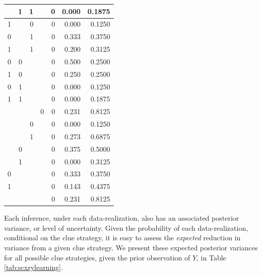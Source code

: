 \documentclass[
  12pt,
]{book}
\begin{document}
\begin{table}
\begin{tabular}[t]{r|r|r|r|r|r|r}
\hline
 & 1 & 1 &  & 0 & 0.000 & 0.1875\\
\hline
1 &  & 0 &  & 0 & 0.000 & 0.1250\\
\hline
0 &  & 1 &  & 0 & 0.333 & 0.3750\\
\hline
1 &  & 1 &  & 0 & 0.200 & 0.3125\\
\hline
0 & 0 &  &  & 0 & 0.500 & 0.2500\\
\hline
1 & 0 &  &  & 0 & 0.250 & 0.2500\\
\hline
0 & 1 &  &  & 0 & 0.000 & 0.1250\\
\hline
1 & 1 &  &  & 0 & 0.000 & 0.1875\\
\hline
 &  &  & 0 & 0 & 0.231 & 0.8125\\
\hline
 &  & 0 &  & 0 & 0.000 & 0.1250\\
\hline
 &  & 1 &  & 0 & 0.273 & 0.6875\\
\hline
 & 0 &  &  & 0 & 0.375 & 0.5000\\
\hline
 & 1 &  &  & 0 & 0.000 & 0.3125\\
\hline
0 &  &  &  & 0 & 0.333 & 0.3750\\
\hline
1 &  &  &  & 0 & 0.143 & 0.4375\\
\hline
 &  &  &  & 0 & 0.231 & 0.8125\\
\hline
\end{tabular}
\end{table}

Each inference, under each data-realization, also has an associated posterior variance, or level of uncertainty. Given the probability of each data-realization, conditional on the clue strategy, it is easy to assess the \emph{expected} reduction in variance from a given clue strategy. We present these expected posterior variances for all possible clue strategies, given the prior observation of \(Y\), in Table \ref{tab:scxrylearning}.
\end{document}
